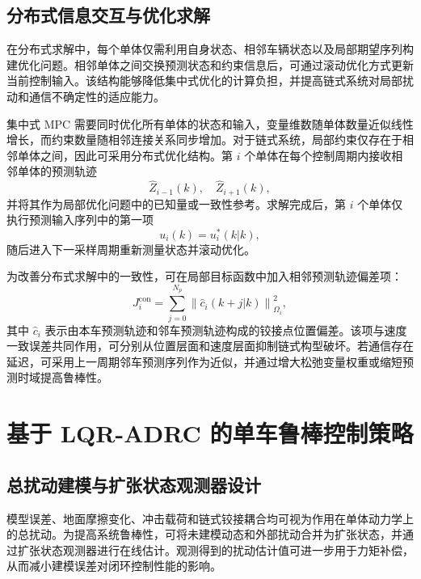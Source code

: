 \documentclass[type=bachelor]{bithesis}
\begin{document}
\subsection{分布式信息交互与优化求解}
在分布式求解中，每个单体仅需利用自身状态、相邻车辆状态以及局部期望序列构建优化问题。相邻单体之间交换预测状态和约束信息后，可通过滚动优化方式更新当前控制输入。该结构能够降低集中式优化的计算负担，并提高链式系统对局部扰动和通信不确定性的适应能力。

集中式 MPC 需要同时优化所有单体的状态和输入，变量维数随单体数量近似线性增长，而约束数量随相邻连接关系同步增加。对于链式系统，局部约束仅存在于相邻单体之间，因此可采用分布式优化结构。第 $i$ 个单体在每个控制周期内接收相邻单体的预测轨迹
\begin{equation}
  \hat{Z}_{i-1}(k),\quad \hat{Z}_{i+1}(k),
\end{equation}
并将其作为局部优化问题中的已知量或一致性参考。求解完成后，第 $i$ 个单体仅执行预测输入序列中的第一项
\begin{equation}
  u_i(k)=u_i^\ast(k|k),
\end{equation}
随后进入下一采样周期重新测量状态并滚动优化。

为改善分布式求解中的一致性，可在局部目标函数中加入相邻预测轨迹偏差项：
\begin{equation}
  J_i^{\mathrm{con}}=
  \sum_{j=0}^{N_p}
  \left\|
  \hat{c}_i(k+j|k)
  \right\|_{\Omega_i}^2 ,
\end{equation}
其中 $\hat{c}_i$ 表示由本车预测轨迹和邻车预测轨迹构成的铰接点位置偏差。该项与速度一致误差共同作用，可分别从位置层面和速度层面抑制链式构型破坏。若通信存在延迟，可采用上一周期邻车预测序列作为近似，并通过增大松弛变量权重或缩短预测时域提高鲁棒性。

\section{基于 LQR-ADRC 的单车鲁棒控制策略}
\subsection{总扰动建模与扩张状态观测器设计}
模型误差、地面摩擦变化、冲击载荷和链式铰接耦合均可视为作用在单体动力学上的总扰动。为提高系统鲁棒性，可将未建模动态和外部扰动合并为扩张状态，并通过扩张状态观测器进行在线估计。观测得到的扰动估计值可进一步用于力矩补偿，从而减小建模误差对闭环控制性能的影响。
\end{document}
